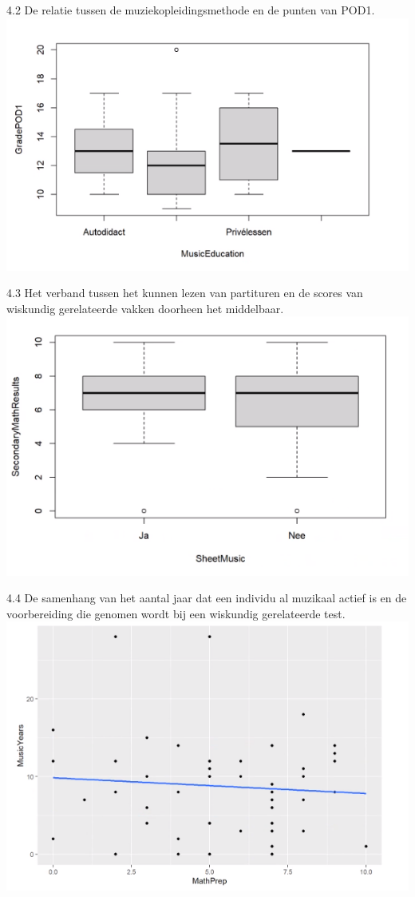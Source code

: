 \documentclass{hogent-article}
\begin{document}
4.2 De relatie tussen de muziekopleidingsmethode en de punten van POD1.\newline
\includegraphics[scale=0.5]{../rapport/img/2.PNG}

4.3 Het verband tussen het kunnen lezen van partituren en de scores van wiskundig gerelateerde vakken doorheen het middelbaar. \newline
\includegraphics[scale=0.5]{../rapport/img/3.PNG}

4.4 De samenhang van het aantal jaar dat een individu al muzikaal actief is en de voorbereiding die genomen wordt bij een wiskundig gerelateerde test.\newline
\includegraphics[scale=0.5]{../rapport/img/4.PNG}
\end{document}
